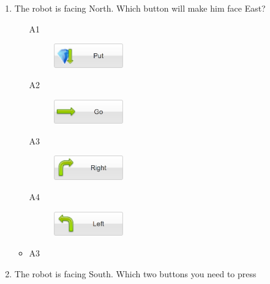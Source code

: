 \documentclass[article,A4,12pt]{llncs}
\begin{document}
\begin{enumerate}
\begin{itemize}
  \end{itemize}
\item The robot is facing North. Which button will make him face East?
\begin{enumerate}
\item[A1] 
\begin{figure}[!ht]
\begin{center}
\includegraphics[width=3cm]{imgk/button-put-1.png}
\vspace{-10mm}
\end{center}
\end{figure}
\item[A2] 
\begin{figure}[!ht]
\begin{center}
\includegraphics[width=3cm]{imgk/button-go-1.png}
\vspace{-10mm}
\end{center}
\end{figure}
\item[A3] 
\begin{figure}[!ht]
\begin{center}
\includegraphics[width=3cm]{imgk/button-right-2.png}
\vspace{-10mm}
\end{center}
\end{figure}
\item[A4] 
\begin{figure}[!ht]
\begin{center}
\includegraphics[width=3cm]{imgk/button-left-2.png}
\end{center}
\end{figure}
\end{enumerate}
  \begin{itemize}
    \item A3
  \end{itemize}
\item The robot is facing South. Which two buttons you need to press 

\end{enumerate}
\end{document}
